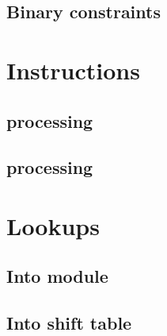 \subsection{Binary constraints}              \label{rlp utils: constraints: binarities}               

\section{Instructions}                       \label{rlp utils: instructions}
\subsection{ processing}       \label{rlp utils: instructions: integer processing}      
\subsection{ processing}    \label{rlp utils: instructions: byte string processing}  

\section{Lookups}                            \label{rlp utils: lookups}
\subsection{Into \wcpMod{} module}           \label{rlp utils: lookups: rlp utils into wcp}           
\subsection{Into shift table}                \label{rlp utils: lookups: rlp utils into shf table}     
